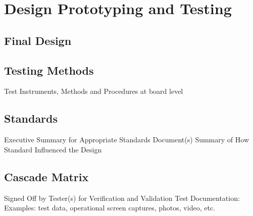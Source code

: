 \chapter{Design Prototyping and Testing}
\section{Final Design}
\section{Testing Methods}
Test Instruments, Methods and Procedures at board level
\section{Standards}
Executive Summary for Appropriate Standards Document(s)
Summary of How Standard Influenced the Design
\section{Cascade Matrix}
Signed Off by Tester(s) for Verification and Validation
Test Documentation: Examples: test data, operational screen captures, photos,
video, etc.